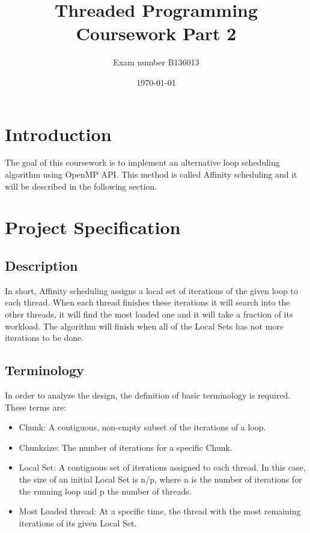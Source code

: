 \documentclass[12pt,a4paper]{article}
\newcommand{\sectionVspacing}{\vspace{15pt}}
\begin{document}
\title{Threaded Programming Coursework Part 2}
\author{Exam number B136013}
\date{\today}

\makeEPCCtitle

\thispagestyle{empty}

\newpage
\clearpage

\tableofcontents

\newpage
\clearpage

\section{Introduction}

The goal of this coursework is to implement an alternative loop scheduling algorithm using OpenMP API. This method is called Affinity scheduling and it will be described in the following section.

\sectionVspacing

\section{Project Specification}
\subsection{Description}

In short, Affinity scheduling assigns a local set of iterations of the given loop to each thread. When each thread finishes these iterations it will search into the other threads, it will find the most loaded one and it will take a fraction of its workload. The algorithm will finish when all of the Local Sets has not more iterations to be done.

\subsection{Terminology}

In order to analyze the design, the definition of basic terminology is required. These terms are:

\begin{itemize}
  \item Chunk: A contiguous, non-empty subset of the iterations of a loop.
  \item Chunksize: The number of iterations for a specific Chunk.
  \item Local Set: A contiguous set of iterations assigned to each thread. In this case, the size of an initial Local Set is n/p, where n is the number of iterations for the running loop and p the number of threads.
  \item Most Loaded thread: At a specific time, the thread with the most remaining iterations of its given Local Set.
\end{itemize}
\end{document}
